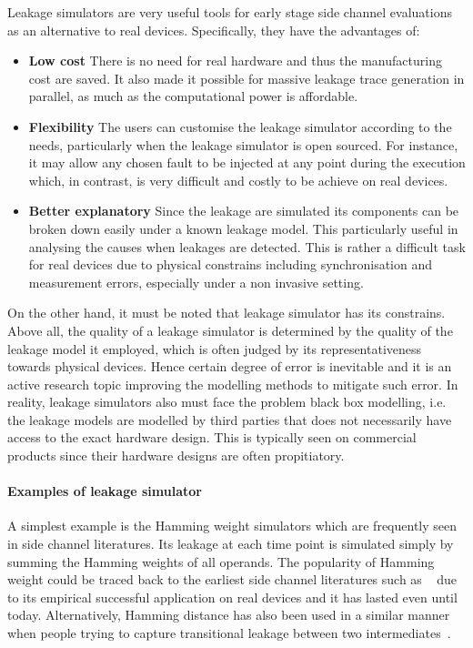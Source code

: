 \documentclass[]{report}
\begin{document}
Leakage simulators are very useful tools for early stage side channel evaluations as an alternative to real devices. Specifically, they have the advantages of:
\begin{itemize} %
	\item \textbf{Low cost} There is no need for real hardware and thus the manufacturing cost are saved. It also made it possible for massive leakage trace generation in parallel, as much as the computational power is affordable.
	\item \textbf{Flexibility} The users can customise the leakage simulator according to the needs, particularly when the leakage simulator is open sourced. For instance, it may allow any chosen fault to be injected at any point during the execution which, in contrast, is very difficult and costly to be achieve on real devices.
	\item \textbf{Better explanatory} Since the leakage are simulated its components can be broken down easily under a known leakage model. This particularly useful in analysing the causes when leakages are detected. This is rather a difficult task for real devices due to physical constrains including synchronisation and measurement errors, especially under a non invasive setting.
\end{itemize}

On the other hand, it must be noted that leakage simulator has its constrains. Above all, the quality of a leakage simulator is determined by the quality of the leakage model it employed, which is often judged by its representativeness towards physical devices. Hence certain degree of error is inevitable and it is an active research topic improving the modelling methods to mitigate such error. In reality, leakage simulators also must face the problem black box modelling, i.e. the leakage models are modelled by third parties that does not necessarily have access to the exact hardware design. This is typically seen on commercial products since their hardware designs are often propitiatory.


\paragraph{Examples of leakage simulator}
A simplest example is the Hamming weight simulators which are frequently seen in side channel literatures. Its leakage at each time point is simulated simply by summing the Hamming weights of all operands. The popularity of Hamming weight could be traced back to the earliest side channel literatures such as ~\cite{CPA} due to its empirical successful application on real devices and it has lasted even until today. Alternatively, Hamming distance has also been used in a similar manner when people trying to capture transitional leakage between two intermediates~\cite{CPA}.
\end{document}
